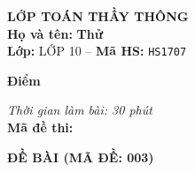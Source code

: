 \noindent
\begin{tcolorbox}[colback=white,colframe=black,arc=0mm,boxrule=0.8pt,top=4pt,bottom=4pt,left=6pt,right=6pt]
	\begin{minipage}[c]{0.44\textwidth}
		{\bfseries\large LỚP TOÁN THẦY THÔNG}\\[3pt]
		\textbf{Họ và tên:} \textbf{\large Thử}\\[3pt]
		\textbf{Lớp:} LỚP 10 \quad -- \quad \textbf{Mã HS:} \texttt{HS1707}
	\end{minipage}
	\hfill
	\begin{minipage}[c]{0.22\textwidth}
		\begin{tcolorbox}[colback=white,colframe=black,arc=0mm,boxrule=0.6pt,height=1.8cm,halign=center,valign=top,top=2pt]
			{\bfseries\normalsize Điểm}
		\end{tcolorbox}
	\end{minipage}
	\hfill
	\begin{minipage}[c]{0.30\textwidth}
		\raggedleft
		\textit{Thời gian làm bài: 30 phút}\\[4pt]
		\textbf{Mã đề thi:} 
	\end{minipage}
\end{tcolorbox}
\vspace{0.25cm}

\noindent\textbf{\large ĐỀ BÀI (MÃ ĐỀ: 003)}
\vspace{0.1cm}

